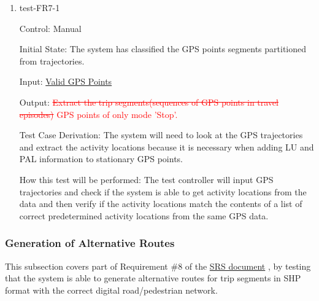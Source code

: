 \documentclass[12pt, titlepage]{article}
\begin{document}
\begin{enumerate}

\item{test-FR7-1\\} \label{test-FR7-1}

Control: Manual 
					
Initial State: The system has classified the GPS points segments partitioned from trajectories.
					
Input: \href{https://github.com/paezha/PyERT-BLACK/blob/rev0-test/quarto-example/data/sample-gps/sample-gps-1.csv}{Valid GPS Points}
					
Output: \textcolor{red}{\sout{Extract the trip segments(sequences of GPS points in travel episodes)} GPS points of only mode 'Stop'.}

Test Case Derivation: The system will need to look at the GPS trajectories and extract the activity locations because it is necessary when adding LU and PAL information to stationary GPS points.
					
How this test will be performed: The test controller will input GPS trajectories and check if the system is able to get activity locations from the data and then verify if the activity locations match the contents of a list of correct predetermined activity locations from the same GPS data.

\end{enumerate}

\subsubsection{Generation of Alternative Routes}

This subsection covers part of Requirement \#8 of the \href{https://github.com/paezha/PyERT-BLACK/blob/main/docs/SRS/SRS.pdf}{SRS document} \citep{SRS}, by testing that the system is able to generate alternative routes for trip segments in SHP format with the correct digital road/pedestrian network.
\end{document}
